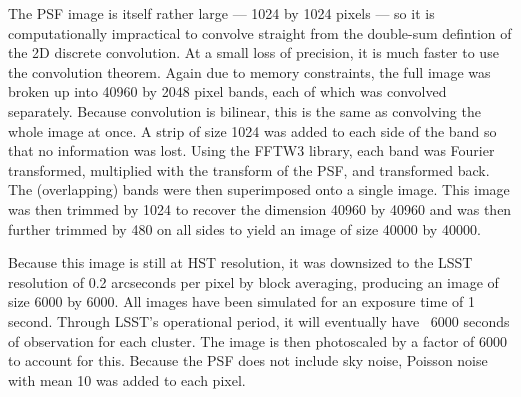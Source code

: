 \documentclass[10pt,twoside]{article}
\theoremstyle{definition}
\theoremstyle{exercise}
\begin{document}
The PSF image is itself rather large --- 1024 by 1024 pixels --- so it is computationally impractical to convolve straight from the double-sum defintion of the 2D discrete convolution. At a small loss of precision, it is much faster to use the convolution theorem. Again due to memory constraints, the full image was broken up into 40960 by 2048 pixel bands, each of which was convolved separately. Because convolution is bilinear, this is the same as convolving the whole image at once. A strip of size 1024 was added to each side of the band so that no information was lost. Using the FFTW3 library, each band was Fourier transformed, multiplied with the transform of the PSF, and transformed back. The (overlapping) bands were then superimposed onto a single image. This image was then trimmed by 1024 to recover the dimension 40960 by 40960 and was then further trimmed by 480 on all sides to yield an image of size 40000 by 40000. 

Because this image is still at HST resolution, it was downsized to the LSST resolution of 0.2 arcseconds per pixel by block averaging, producing an image of size 6000 by 6000. All images have been simulated for an exposure time of 1 second. Through LSST's operational period, it will eventually have ~6000 seconds of observation for each cluster. The image is then photoscaled by a factor of 6000 to account for this. Because the PSF does not include sky noise, Poisson noise with mean 10 was added to each pixel.

\end{document}
